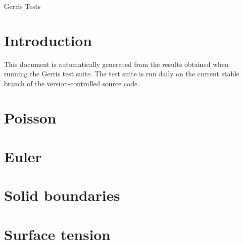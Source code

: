 \documentclass[a4paper]{article}
\begin{document}
\mbox{}\vspace{1cm}
\begin{center}
{\Huge Gerris Tests}\\
\vspace{1cm}

\vspace{5mm}
\end{center}

\section{Introduction}

This document is automatically generated from the results obtained
when running the Gerris test suite. The test suite is run daily on the
current stable branch of the version-controlled source code.

\section{Poisson}






\section{Euler}






\section{Solid boundaries}




\section{Surface tension}





\end{document}

